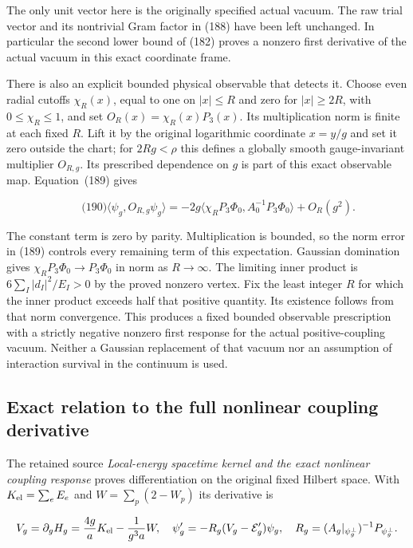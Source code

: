 The only unit vector here is the originally specified actual vacuum. The
raw trial vector and its nontrivial Gram factor in (188) have been left
unchanged. In particular the second lower bound of (182) proves a
nonzero first derivative of the actual vacuum in this exact coordinate
frame.

There is also an explicit bounded physical observable that detects it.
Choose even radial cutoffs \(\chi_R(x)\), equal to one on \(|x|\le R\)
and zero for \(|x|\ge2R\), with \(0\le\chi_R\le1\), and set
\(O_R(x)=\chi_R(x)P_3(x)\). Its multiplication norm is finite at each
fixed \(R\). Lift it by the original logarithmic coordinate \(x=y/g\)
and set it zero outside the chart; for \(2Rg<\rho\) this defines a
globally smooth gauge-invariant multiplier \(O_{R,g}\). Its prescribed
dependence on \(g\) is part of this exact observable map. Equation~(189)
gives

\[
\qquad\text{(190)}
 \langle\psi_g,O_{R,g}\psi_g\rangle
   =-2g\langle\chi_RP_3\Phi_0,A_0^{-1}P_3\Phi_0\rangle+O_R(g^2).
\]

The constant term is zero by parity. Multiplication is bounded, so the
norm error in (189) controls every remaining term of this expectation.
Gaussian domination gives \(\chi_RP_3\Phi_0\to P_3\Phi_0\) in norm as
\(R\to\infty\). The limiting inner product is \(6\sum_I|d_I|^2/E_I>0\)
by the proved nonzero vertex. Fix the least integer \(R\) for which the
inner product exceeds half that positive quantity. Its existence follows
from that norm convergence. This produces a fixed bounded observable
prescription with a strictly negative nonzero first response for the
actual positive-coupling vacuum. Neither a Gaussian replacement of that
vacuum nor an assumption of interaction survival in the continuum is
used.

\subsection{Exact relation to the full nonlinear coupling
derivative}\label{nonabelian-vertex-md-exact-relation-to-the-full-nonlinear-coupling-derivative}

The retained source \emph{Local-energy spacetime kernel and the exact
nonlinear coupling response} proves differentiation on the original
fixed Hilbert space. With \(K_{\rm el}=\sum_eE_e\) and
\(W=\sum_p(2-W_p)\) its derivative is

\[
V_g=\partial_gH_g=\frac{4g}{a}K_{\rm el}-\frac1{g^3a}W,
 \quad \psi'_g=-R_g(V_g-\mathcal E'_g)\psi_g,
 \quad R_g=(A_g|_{\psi_g^\perp})^{-1}P_{\psi_g^\perp}.
\]

